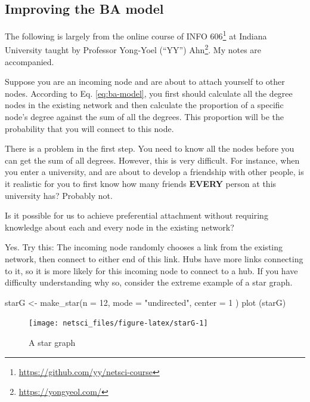 \documentclass[
]{krantz}
\makeatletter
\newenvironment{Shaded}{\begin{snugshade}}{\end{snugshade}}
\newcommand{\AttributeTok}[1]{\textcolor[rgb]{0.61,0.61,0.61}{#1}}
\newcommand{\DecValTok}[1]{\textcolor[rgb]{0.06,0.06,0.06}{#1}}
\newcommand{\FunctionTok}[1]{\textcolor[rgb]{0,0,0}{#1}}
\newcommand{\NormalTok}[1]{#1}
\newcommand{\OtherTok}[1]{\textcolor[rgb]{0.37,0.37,0.37}{#1}}
\newcommand{\StringTok}[1]{\textcolor[rgb]{0.5,0.5,0.5}{#1}}
\renewcommand{\href}[2]{#2\footnote{\url{#1}}}
\newenvironment{kframe}{%
\medskip{}
\setlength{\fboxsep}{.8em}
 \def\at@end@of@kframe{}%
 \ifinner\ifhmode%
  \def\at@end@of@kframe{\end{minipage}}%
  \begin{minipage}{\columnwidth}%
 \fi\fi%
 \def\FrameCommand##1{\hskip\@totalleftmargin \hskip-\fboxsep
 \colorbox{shadecolor}{##1}\hskip-\fboxsep
     \hskip-\linewidth \hskip-\@totalleftmargin \hskip\columnwidth}%
 \MakeFramed {\advance\hsize-\width
   \@totalleftmargin\z@ \linewidth\hsize
   \@setminipage}}%
 {\par\unskip\endMakeFramed%
 \at@end@of@kframe}
\renewenvironment{Shaded}{\begin{kframe}}{\end{kframe}}
\newenvironment{rmdblock}[1]
  {
  \begin{itemize}
  \renewcommand{\labelitemi}{
    \raisebox{-.7\height}[0pt][0pt]{
      {\setkeys{Gin}{width=3em,keepaspectratio}\texttt{[image: images/\#1]}}
    }
  }
  \setlength{\fboxsep}{1em}
  \begin{kframe}
  \item
  }
  {
  \end{kframe}
  \end{itemize}
  }
\newenvironment{rmdnote}
  {\begin{rmdblock}{note}}
  {\end{rmdblock}}
\makeatother
\begin{document}
\hypertarget{improving-the-ba-model}{%
\subsection{Improving the BA model}\label{improving-the-ba-model}}

\begin{rmdnote}
The following is largely from the online course of \href{https://github.com/yy/netsci-course}{INFO 606} at Indiana University taught by Professor \href{https://yongyeol.com/}{Yong-Yoel (``YY'') Ahn}. My notes are accompanied.
\end{rmdnote}

Suppose you are an incoming node and are about to attach yourself to other nodes. According to Eq. \eqref{eq:ba-model}, you first should calculate all the degree nodes in the existing network and then calculate the proportion of a specific node's degree against the sum of all the degrees. This proportion will be the probability that you will connect to this node.

There is a problem in the first step. You need to know all the nodes before you can get the sum of all degrees. However, this is very difficult. For instance, when you enter a university, and are about to develop a friendship with other people, is it realistic for you to first know how many friends \textbf{EVERY} person at this university has? Probably not.

Is it possible for us to achieve preferential attachment without requiring knowledge about each and every node in the existing network?

Yes. Try this: The incoming node randomly chooses a link from the existing network, then connect to either end of this link. Hubs have more links connecting to it, so it is more likely for this incoming node to connect to a hub. If you have difficulty understanding why so, consider the extreme example of a star graph.

\begin{Shaded}
\begin{Highlighting}[]
\NormalTok{starG }\OtherTok{\textless{}{-}} \FunctionTok{make\_star}\NormalTok{(}\AttributeTok{n =} \DecValTok{12}\NormalTok{, }\AttributeTok{mode =} \StringTok{"undirected"}\NormalTok{, }\AttributeTok{center =} \DecValTok{1}\NormalTok{ )}
\FunctionTok{plot}\NormalTok{ (starG)}
\end{Highlighting}
\end{Shaded}

\begin{figure}

{\centering \texttt{[image: netsci\_files/figure-latex/starG-1]} 

}

\caption{A star graph}\label{fig:starG}
\end{figure}
\end{document}
